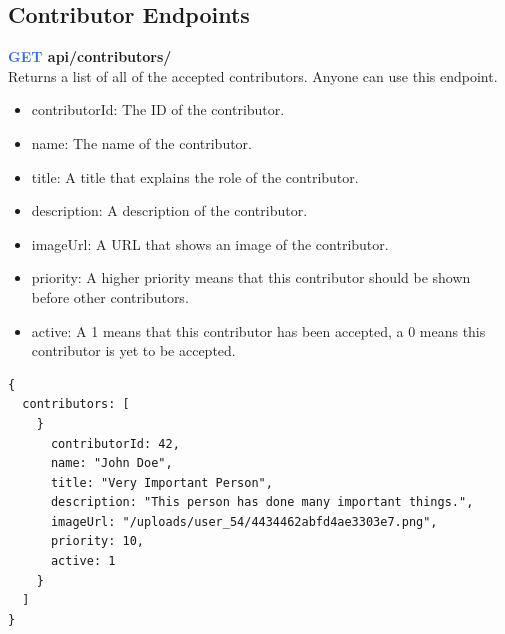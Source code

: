 \documentclass[onecolumn, draftclsnofoot,10pt, compsoc, usenames, dvipsnames]{IEEEtran}
\begin{document}
\subsection{Contributor Endpoints}


\noindent
\textbf{\textcolor{RoyalBlue}{GET} api/contributors/} \\
Returns a list of all of the accepted contributors. Anyone can use this endpoint.
\begin{itemize}
    \item contributorId: The ID of the contributor.
    \item name: The name of the contributor.
    \item title: A title that explains the role of the contributor.
    \item description: A description of the contributor.
    \item imageUrl: A URL that shows an image of the contributor.
    \item priority: A higher priority means that this contributor should be shown before other contributors.
    \item active: A 1 means that this contributor has been accepted, a 0 means this contributor is yet to be accepted.
\end{itemize}
\begin{lstlisting}[caption=Example Response]
{
  contributors: [
    }
      contributorId: 42,
      name: "John Doe",
      title: "Very Important Person",
      description: "This person has done many important things.",
      imageUrl: "/uploads/user_54/4434462abfd4ae3303e7.png",
      priority: 10,
      active: 1
    }
  ]
}
\end{lstlisting}
\\~\\
\end{document}
